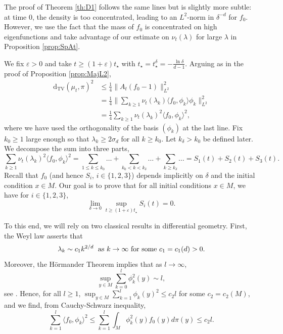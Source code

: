 \documentclass[]{scrartcl}
\newcommand{\DTV}{\mathrm{d_{TV}}}
\numberwithin{equation}{section}
\numberwithin{figure}{section}
\begin{document}
The proof of Theorem \ref{th:D1} follows the same lines but is slightly more subtle: at time 0, the density is too concentrated, leading to an $L^2$-norm in $\delta^{-d}$ for $f_0$. However, we use the fact that the mass of $f_0$ is concentrated on high eigenfunctions and take advantage of our estimate on $\nu_t(\lambda)$ for large $\lambda$ in Proposition \ref{prop:SpAt}. 


We fix $\varepsilon > 0$ and take 	$t \geq (1+\varepsilon)t_\star$ with  $t_\star  = t_\star^\delta = - \frac{\ln \delta}{d-1}$. Arguing as in the proof of Proposition \ref{prop:MajL2},
\begin{align*} \DTV\left( \mu_t,\pi \right)^2 
	&\leq \frac{1}{4} \lVert A_t(f_0 - 1)\rVert^2_{L^2}			
	\\&= \frac{1}{4}\lVert \sum_{k \geq 1} \nu_t(\lambda_k)\langle f_0, \phi_k \rangle \phi_k \rVert^2_{L^2} \\
	& = \frac 1 4 \sum_{k \geq 1} \nu_t(\lambda_k)^2 \langle f_0, \phi_k \rangle^2 ,
\end{align*}
where we have used the orthogonality of the basis $(\phi_k)$ at the last line. 	Fix $k_0 \geq 1$ large enough so that $\lambda_k \geq 2 \sigma_d$ for all $k \geq k_0$. Let $k_\delta > k_0$ be defined later. We decompose the sum into three parts, 
\begin{equation*}
	\sum_{k \geq 1} \nu_t(\lambda_k)^2 \langle f_0, \phi_k \rangle^2 = \sum_{1 \leq k \leq k_0} \dots + \sum_{ k_0 < k < k_\delta} \dots +   \sum_{ k \geq k_\delta} \dots = S_{1}(t) + S_{2} (t) + S_{3} (t).
\end{equation*}
Recall that $f_0$ (and hence $S_i$, $i \in \{1,2,3\}$) depends implicitly on $\delta$ and the initial condition $x \in M$. 
Our goal is to prove that for all initial conditions $x \in M$, we have for $i \in \{1,2,3\}$,  		
\begin{equation}\label{eq:limSi}
\lim_{\delta \to 0} \sup_{t \geq (1+\varepsilon) t_{\star}}  S_{i}(t) = 0.
\end{equation}



To this end, we will rely on two classical results in differential geometry. First, the Weyl law asserts that 
\begin{equation}\label{eq:weyl}
\lambda_k \sim c_1 k^{2/d} \; \hbox{ as $k \to \infty$ for some $c_1 = c_1(d) >0$}.
\end{equation}
Moreover, the H\"ormander Theorem implies that as $l \to \infty$,
$$
\sup_{y \in M} \sum_{k=0}^l \phi^2_k(y) \sim l, 
$$
see \cite[Theorem 16.1]{zbMATH01637290}. Hence, for all $l \geq 1$,  $\sup_{y \in M} \sum_{k=1}^l \phi_k(y)^2 \leq c_2 l$ for some $c_2 = c_2(M)$, and we find, from Cauchy-Schwarz inequality,  
\begin{equation}\label{eq:lwl}
 \sum_{k=1}^l \langle f_0, \phi_k \rangle^2  \leq \sum_{k=1}^l \int_M \phi^2_k(y) f_0(y) d\pi(y) \leq c_2 l.
\end{equation}
\end{document}
